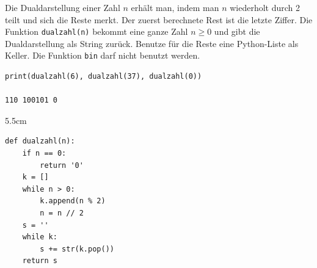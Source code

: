 \question[4]
Die Dualdarstellung einer Zahl $n$ erhält man, indem man $n$ wiederholt durch 2 teilt und sich die Reste merkt. Der zuerst
berechnete Rest ist die letzte Ziffer. Die Funktion \texttt{dualzahl(n)} bekommt eine ganze Zahl $n \geq 0$ und gibt
die Dualdarstellung als String zurück. Benutze für die Reste eine Python-Liste als Keller.
Die Funktion \texttt{bin} darf nicht benutzt werden.
\begin{lstlisting}
print(dualzahl(6), dualzahl(37), dualzahl(0))

110 100101 0
\end{lstlisting}
\begin{solutionbox}{5.5cm}
\begin{lstlisting}
def dualzahl(n):
    if n == 0:
        return '0'
    k = []
    while n > 0:
        k.append(n % 2)
        n = n // 2
    s = ''
    while k:
        s += str(k.pop())
    return s
\end{lstlisting}
\end{solutionbox}
